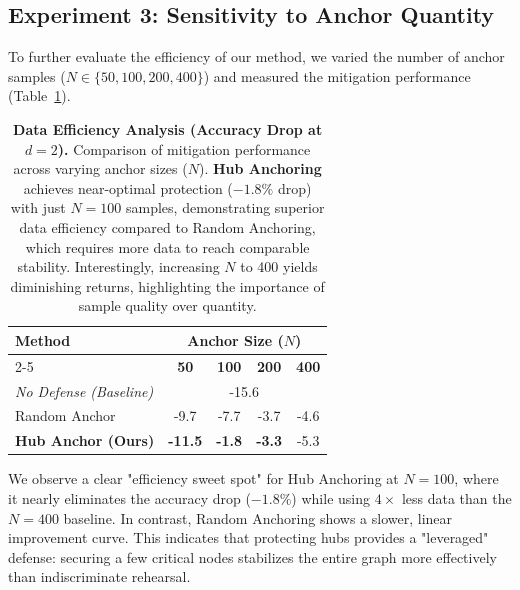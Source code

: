 \subsection{Experiment 3: Sensitivity to Anchor Quantity}

To further evaluate the efficiency of our method, we varied the number of anchor samples ($N \in \{50, 100, 200, 400\}$) and measured the mitigation performance (Table~\ref{tab:data_efficiency}).

\begin{table}[h]
\centering
\small
\setlength{\tabcolsep}{6pt}
\caption{\textbf{Data Efficiency Analysis (Accuracy Drop at $d=2$).} 
Comparison of mitigation performance across varying anchor sizes ($N$). 
\textbf{Hub Anchoring} achieves near-optimal protection ($-1.8\%$ drop) with just $N=100$ samples, demonstrating superior data efficiency compared to Random Anchoring, which requires more data to reach comparable stability. Interestingly, increasing $N$ to 400 yields diminishing returns, highlighting the importance of sample quality over quantity.}
\label{tab:data_efficiency}
\begin{tabular}{l cccc}
\toprule
\textbf{Method} & \multicolumn{4}{c}{\textbf{Anchor Size ($N$)}} \\
\cmidrule(lr){2-5}
 & \textbf{50} & \textbf{100} & \textbf{200} & \textbf{400} \\
\midrule
\textit{No Defense (Baseline)} & \multicolumn{4}{c}{-15.6} \\
\midrule
Random Anchor & -9.7 & -7.7 & -3.7 & -4.6 \\
\textbf{Hub Anchor (Ours)} & \textbf{-11.5} & \textbf{-1.8} & \textbf{-3.3} & -5.3 \\
\bottomrule
\end{tabular}
\end{table}

We observe a clear "efficiency sweet spot" for Hub Anchoring at $N=100$, where it nearly eliminates the accuracy drop ($-1.8\%$) while using $4\times$ less data than the $N=400$ baseline. In contrast, Random Anchoring shows a slower, linear improvement curve. This indicates that protecting hubs provides a "leveraged" defense: securing a few critical nodes stabilizes the entire graph more effectively than indiscriminate rehearsal.
